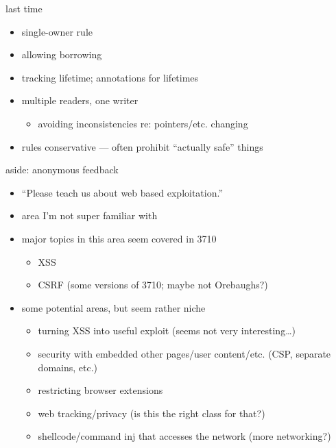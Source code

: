 \date{}
\title{}
\date{}
\usepackage[outputdir=latex.out]{minted}

\begin{frame}
    \titlepage
\end{frame}

\begin{frame}{last time}
    \begin{itemize}
    \item single-owner rule
    \item allowing borrowing
    \item tracking lifetime; annotations for lifetimes
    \item multiple readers, one writer
        \begin{itemize}
        \item avoiding inconsistencies re: pointers/etc. changing
        \end{itemize}
    \item rules conservative --- often prohibit ``actually safe'' things
    \end{itemize}
\end{frame}



\begin{frame}{aside: anonymous feedback}
    \begin{itemize}
    \item ``Please teach us about web based exploitation.''
    \item area I'm not super familiar with
    \item major topics in this area seem covered in 3710
        \begin{itemize}
        \item XSS
        \item CSRF (some versions of 3710; maybe not Orebaughs?)
        \end{itemize}
    \item some potential areas, but seem rather niche
        \begin{itemize}
        \item turning XSS into useful exploit (seems not very interesting\ldots)
        \item security with embedded other pages/user content/etc. (CSP, separate domains, etc.)
        \item restricting browser extensions
        \item web tracking/privacy (is this the right class for that?)
        \item shellcode/command inj that accesses the network (more networking?)
        \end{itemize}
    \end{itemize}
\end{frame}

